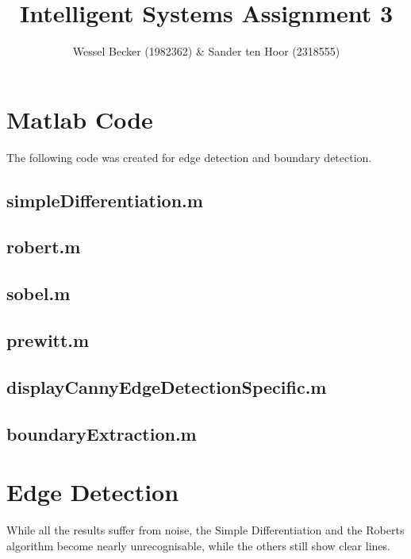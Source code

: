 \documentclass[10pt,a4paper]{article}
\begin{document}
\title{Intelligent Systems Assignment 3}
\author{Wessel Becker (1982362) \& Sander ten Hoor (2318555)}
\maketitle

\section{Matlab Code}
The following code was created for edge detection and boundary detection.

\subsection{simpleDifferentiation.m}


\subsection{robert.m}


\subsection{sobel.m}


\subsection{prewitt.m}


\subsection{displayCannyEdgeDetectionSpecific.m}


\subsection{boundaryExtraction.m}
\label{list:boundaryExtraction}

\section{Edge Detection}
While all the results suffer from noise, the Simple Differentiation and the Roberts algorithm become nearly unrecognisable, while the others still show clear lines.
\end{document}
